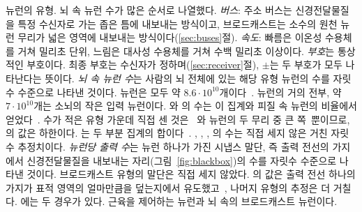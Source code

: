 \begin{table}[t]
\caption{뉴런의 유형. 뇌 속 뉴런 수가 많은 순서로 나열했다. \emph{버스}: 주소 버스는 신경전달물질을 특정 수신자로 가는 좁은 틈에 내보내는 방식이고, 브로드캐스트는 소수의 원천 뉴런 무리가 넓은 영역에 내보내는 방식이다(\ref{sec:buses}절). \emph{속도}: 빠름은 이온성 수용체를 거쳐 밀리초 단위, 느림은 대사성 수용체를 거쳐 수백 밀리초 이상이다. \emph{부호}는 통상적인 부호이다. 최종 부호는 수신자가 정하며(\ref{sec:receiver}절), $\pm$는 두 부호가 모두 나타난다는 뜻이다. \emph{뇌 속 뉴런 수}는 사람의 뇌 전체에 있는 해당 유형 뉴런의 수를 자릿수 수준으로 나타낸 것이다. 뉴런은 모두 약 $8.6\cdot10^{10}$개이다~\cite{Azevedo2009}.  뉴런의 거의 전부, 약 $7\cdot10^{10}$개는 소뇌의 작은 입력 뉴런이다. 와 의 수는 이 집계와 피질 속  뉴런의 비율에서 얻었다~\cite{Hendry1987}. 수가 적은 유형 가운데 직접 센 것은 ~\cite{Airaksinen1991}와  뉴런의 두 무리 중 큰 쪽~\cite{Pakkenberg1991}뿐이므로, 의 값은 하한이다. 는 두 부분 집계의 합이다~\cite{Baker1990,Baker1991}. , , , 의 수는 직접 세지 않은 거친 자릿수 추정치이다. \emph{뉴런당 출력 수}는 뉴런 하나가 가진 시냅스 말단, 즉 출력 전선의 가지에서 신경전달물질을 내보내는 자리(그림~\ref{fig:blackbox})의 수를 자릿수 수준으로 나타낸 것이다. 브로드캐스트 유형의 말단은 직접 세지 않았다. 의 값은 출력 전선 하나의 가지가 표적 영역의 얼마만큼을 덮는지에서 유도했고~\cite{Matsuda2009}, 나머지 유형의 추정은 더 거칠다. 에는 두 경우가 있다. 근육을 제어하는 뉴런과 뇌 속의 브로드캐스트 뉴런이다.}
\label{tab:types}
\end{table}


